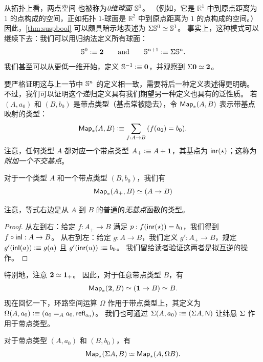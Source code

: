 从拓扑上看，两点空间 \bool 也被称为\emph{0维球面} $\Sn^0$。
（例如，它是 $\mathbb{R}^1$ 中到原点距离为 $1$ 的点构成的空间，正如拓扑 $1$-球面是 $\mathbb{R}^2$ 中到原点距离为 $1$ 的点构成的空间。）
因此，\cref{thm:suspbool} 可以颇具暗示地表述为 $\eqv{\susp\Sn^0}{\Sn^1}$。
%
%
事实上，这种模式可以继续下去：我们可以用归纳法定义所有球面：
\begin{equation}\label{eq:Snsusp}
  \Sn^0 \defeq \bool
  \qquad\text{and}\qquad
  \Sn^{n+1} \defeq \susp \Sn^n.
\end{equation}
我们甚至可以从更低一维开始，定义 $\Sn^{-1}\defeq \emptyt$，并观察到 $\eqv{\susp\emptyt}{\bool}$。

要严格证明这与上一节中 $\Sn^n$ 的定义相一致，需要将后一种定义表述得更明确。
不过，我们可以证明这个递归定义具有我们期望另一种定义也具有的泛性质。
若 $(A,a_0)$ 和 $(B,b_0)$ 是带点类型（基点常被隐去），令 $\Map_*(A,B)$ 表示带基点映射的类型：
\[ \Map_*(A,B) \defeq \sm{f:A\to B} (f(a_0)=b_0). \]
注意，任何类型 $A$ 都对应一个带点类型 $A_+ \defeq A+\unit$，其基点为 $\inr(\ttt)$；这称为\emph{附加一个不交基点}。
%
%
%

\begin{lem}
  对于一个类型 $A$ 和一个带点类型 $(B,b_0)$，我们有
  \[ \eqv{\Map_*(A_+,B)}{(A\to B)} \]
\end{lem}

注意，等式右边是从 $A$ 到 $B$ 的普通的\emph{无基点}函数的类型。

\begin{proof}
  从左到右：给定 $f:A_+ \to B$ 满足 $p:f(\inr(\ttt)) = b_0$，我们得到 $f\circ \inl : A \to B$。
  从右到左：给定 $g:A\to B$，我们定义 $g':A_+ \to B$，规定 $g'(\inl(a))\defeq g(a)$ 且 $g'(\inr(u)) \defeq b_0$。
  我们留给读者验证这两者是拟互逆的操作。
\end{proof}

特别地，注意 $\eqv{\bool}{\unit_+}$。
因此，对于任意带点类型 $B$，有
\[{\Map_*(\bool,B)} \eqvsym {(\unit \to B)}\eqvsym B.\]
%
现在回忆一下，环路空间运算 $\Omega$ 作用于带点类型上，其定义为 $\Omega(A,a_0) \defeq (\id[A]{a_0}{a_0},\refl{a_0})$。
我们也可通过 $\susp(A,a_0)\defeq (\susp A,\north)$ 让纬悬 $\susp$ 作用于带点类型。

\begin{lem}\label{lem:susp-loop-adj}
  对于带点类型 $(A,a_0)$ 和 $(B,b_0)$，有
  \[ \eqv{\Map_*(\susp A, B)}{\Map_*(A,\Omega B)}.\]
\end{lem}


